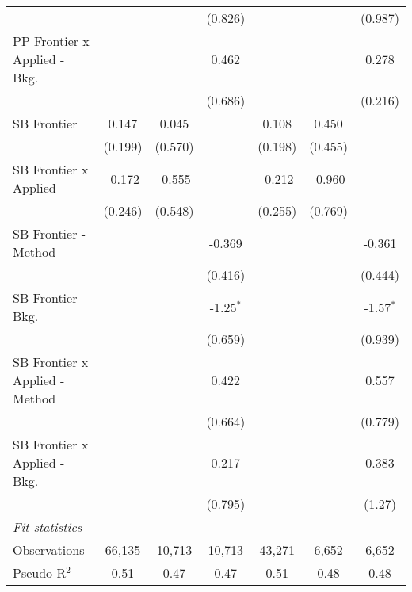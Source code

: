 \begin{tabular}{lcccccc}
                                  &             &              & (0.826)      &              &             & (0.987)\\   
   PP Frontier x Applied - Bkg.   &             &              & 0.462        &              &             & 0.278\\   
                                  &             &              & (0.686)      &              &             & (0.216)\\   
   SB Frontier                    & 0.147       & 0.045        &              & 0.108        & 0.450       &   \\   
                                  & (0.199)     & (0.570)      &              & (0.198)      & (0.455)     &   \\   
   SB Frontier x Applied          & -0.172      & -0.555       &              & -0.212       & -0.960      &   \\   
                                  & (0.246)     & (0.548)      &              & (0.255)      & (0.769)     &   \\   
   SB Frontier - Method           &             &              & -0.369       &              &             & -0.361\\   
                                  &             &              & (0.416)      &              &             & (0.444)\\   
   SB Frontier - Bkg.             &             &              & -1.25$^{*}$  &              &             & -1.57$^{*}$\\   
                                  &             &              & (0.659)      &              &             & (0.939)\\   
   SB Frontier x Applied - Method &             &              & 0.422        &              &             & 0.557\\   
                                  &             &              & (0.664)      &              &             & (0.779)\\   
   SB Frontier x Applied - Bkg.   &             &              & 0.217        &              &             & 0.383\\   
                                  &             &              & (0.795)      &              &             & (1.27)\\   
   \midrule
   \emph{Fit statistics}\\
   Observations                   & 66,135      & 10,713       & 10,713       & 43,271       & 6,652       & 6,652\\  
   Pseudo R$^2$                   & 0.51        & 0.47         & 0.47         & 0.51         & 0.48        & 0.48\\  
   

\end{tabular}
